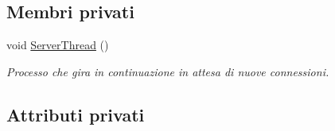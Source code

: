 \subsection*{\-Membri privati}
\begin{DoxyCompactItemize}
\item 
\hypertarget{classServer_a4b2f368d2da82dcdfa1523e27840cd3e}{void \hyperlink{classServer_a4b2f368d2da82dcdfa1523e27840cd3e}{\-Server\-Thread} ()}\label{classServer_a4b2f368d2da82dcdfa1523e27840cd3e}

\begin{DoxyCompactList}\small\item\em \-Processo che gira in continuazione in attesa di nuove connessioni. \end{DoxyCompactList}\end{DoxyCompactItemize}
\subsection*{\-Attributi privati}
